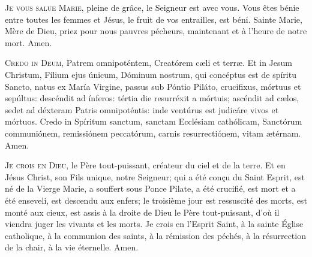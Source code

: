 \documentclass[nocturnal_bvm_fr.tex]{subfiles}
\begin{document}
\begin{paracol}{2}
\switchcolumn

\lettrine{J}{e vous salue Marie}, pleine de grâce, le Seigneur est avec vous.
Vous êtes bénie entre toutes les femmes et Jésus, le fruit de vos entrailles, est béni.
Sainte Marie, Mère de Dieu, priez pour nous pauvres pécheurs, maintenant et à l’heure de notre mort.
Amen.

\switchcolumn*

\lettrine{C}{redo in Deum}, Patrem omnipoténtem, Creatórem cæli et terræ. Et in Jesum Christum, Fílium ejus únicum, Dóminum nostrum,
qui concéptus est de spíritu Sancto, natus ex María Virgine, passus sub Póntio Piláto, crucifixus, mórtuus et sepúltus: descéndit
ad ínferos: tértia die resurréxit a mórtuis; ascéndit ad cælos, sedet ad déxteram Patris omnipoténtis: inde ventúrus est judicáre
vivos et mórtuos. Credo in Spíritum sanctum, sanctam Ecclésiam cathólicam, Sanctórum communiónem, remissiónem peccatórum,
carnis resurrectiónem, vitam ætérnam. Amen.

\switchcolumn

\lettrine{J}{e crois en Dieu}, le Père tout-puissant, créateur du ciel et de la terre.
Et en Jésus Christ, son Fils unique, notre Seigneur;
qui a été conçu du Saint Esprit, est né de la Vierge Marie,
a souffert sous Ponce Pilate, a été crucifié,
est mort et a été enseveli, est descendu aux enfers;
le troisième jour est ressuscité des morts,
est monté aux cieux, est assis à la droite de Dieu le Père tout-puissant,
d’où il viendra juger les vivants et les morts.
Je crois en l’Esprit Saint, à la sainte Église catholique, à la communion des saints,
à la rémission des péchés, à la résurrection de la chair, à la vie éternelle. Amen.

\end{paracol}


\end{document}

